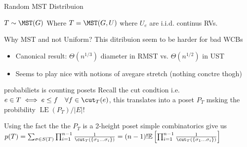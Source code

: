 \begin{frame}{Random MST Distribuion}
    \begin{definition}
        $T\sim \MST(G)$ Where $T=\MST(G,U)$ where $U_e$ are i.i.d. continus RVs.
    \end{definition}
    \begin{block}{Why MST and not Uniform?}
    This ditribuion seem to be harder for bad WCBs
    \begin{itemize}
        \item Canonical result: $\Theta(n^{1/3})$ diameter in RMST vs. $\Theta(n^{1/2})$ in UST
        \item Seems to play nice with notions of avegare stretch (nothing conctre thogh)
    \end{itemize}
    \end{block}

    \begin{block}{probabiliets is counting posets}
        Recall the cut condtion i.e. $e\in T\iff e\leq f \quad \forall f\in \cut_T(e)$, this translates into a poset $P_T$ msking the probibility $\operatorname{LE}(P_T)/|E|! $
    \end{block}
    \begin{theorem}[Lyines=Peres Formula]
        Using the fact the the $P_T$ is a 2-height poset simple combinatorics give us $p(T)=\sum_{\sigma\in S(T)}\prod_{i=1}^{n-1}\frac{1}{\cut_T(\{\sigma_1\ldots \sigma_i\})}=(n-1)!\mathbb{E}\left[\prod_{i=1}^{n-1}\frac{1}{\cut_T(\{\sigma_1\ldots \sigma_i\})}\right]$
    \end{theorem}
\end{frame}